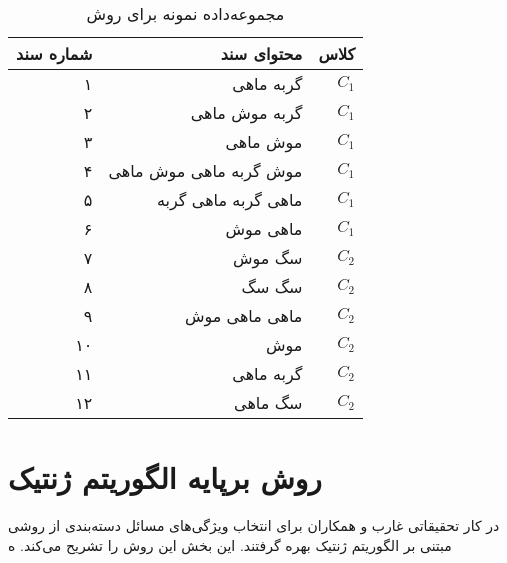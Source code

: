 \begin{table}
\begin{center}
\caption{مجموعه‌داده نمونه برای روش }
\begin{tabular}{r|r|r}
\toprule
\textbf{شماره سند} & \textbf{محتوای سند} & \textbf{کلاس}
\\
\hline
\hline
۱ & گربه ماهی & $C_1$
\\
۲ & گربه موش ماهی & $C_1$
\\
۳ & موش ماهی & $C_1$
\\
۴ & موش گربه ماهی موش ماهی & $C_1$
\\
۵ & ماهی گربه ماهی گربه & $C_1$
\\
۶ & ماهی موش & $C_1$
\\
۷ & سگ موش & $C_2$
\\
۸ & سگ سگ & $C_2$
\\
۹ & ماهی ماهی موش & $C_2$
\\
۱۰ & موش & $C_2$
\\
۱۱ & گربه ماهی & $C_2$
\\
۱۲ & سگ ماهی & $C_2$
\\

\bottomrule
\end{tabular}
\end{center}
\end{table}





\section{روش برپایه الگوریتم ژنتیک}
در کار تحقیقاتی غارب و همکاران\cite{ghareb2016hybrid} برای انتخاب ویژگی‌های مسائل دسته‌بندی از روشی مبتنی بر الگوریتم ژنتیک بهره گرفتند. این بخش این روش را تشریح می‌کند. ه
